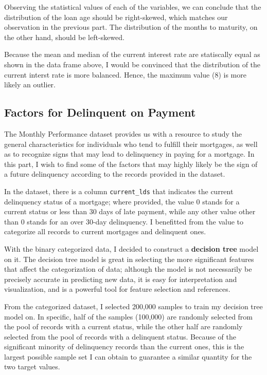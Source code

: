 \documentclass[11pt]{article}
\begin{document}
    Observing the statistical values of each of the variables, we can
conclude that the distribution of the loan age should be right-skewed,
which matches our observation in the previous part. The distribution of
the months to maturity, on the other hand, should be left-skewed.

Because the mean and median of the current interest rate are statiscally
equal as shown in the data frame above, I would be convinced that the
distribution of the current interst rate is more balanced. Hence, the
maximum value (8) is more likely an outlier.

    \hypertarget{factors-for-delinquent-on-payment}{%
\subsection{Factors for Delinquent on
Payment}\label{factors-for-delinquent-on-payment}}

The Monthly Performance dataset provides us with a resource to study the
general characteristics for individuals who tend to fulfill their
mortgages, as well as to recognize signs that may lead to delinquency in
paying for a mortgage. In this part, I wish to find some of the factors
that may highly likely be the sign of a future delinquency according to
the records provided in the dataset.

In the dataset, there is a column \texttt{current\_lds} that indicates
the current delinquency status of a mortgage; where provided, the value
0 stands for a current status or less than 30 days of late payment,
while any other value other than 0 stands for an over 30-day
delinquency. I benefitted from the value to categorize all records to
current mortgages and delinquent ones.

With the binary categorized data, I decided to construct a
\textbf{decision tree} model on it. The decision tree model is great in
selecting the more significant features that affect the categorization
of data; although the model is not necessarily be precisely accurate in
predicting new data, it is easy for interpretation and visualization,
and is a powerful tool for feature selection and references.

From the categorized dataset, I selected 200,000 samples to train my
decision tree model on. In specific, half of the samples (100,000) are
randomly selected from the pool of records with a current status, while
the other half are randomly selected from the pool of records with a
delinquent status. Because of the significant minority of delinquency
records than the current ones, this is the largest possible sample set I
can obtain to guarantee a similar quantity for the two target values.
\end{document}

